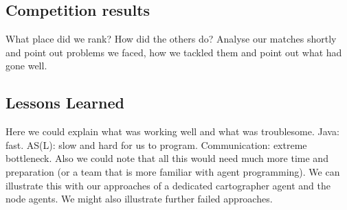 \subsection{Competition results}
What place did we rank? How did the others do? Analyse our matches shortly and point out problems we faced, how we tackled them and point out what had gone well.
\subsection{Lessons Learned}
Here we could explain what was working well and what was troublesome. Java: fast. AS(L): slow and hard for us to program. Communication: extreme bottleneck. Also we could note that all this would need much more time and preparation (or a team that is more familiar with agent programming).
We can illustrate this with our approaches of a dedicated cartographer agent and the node agents. We might also illustrate further failed approaches.
